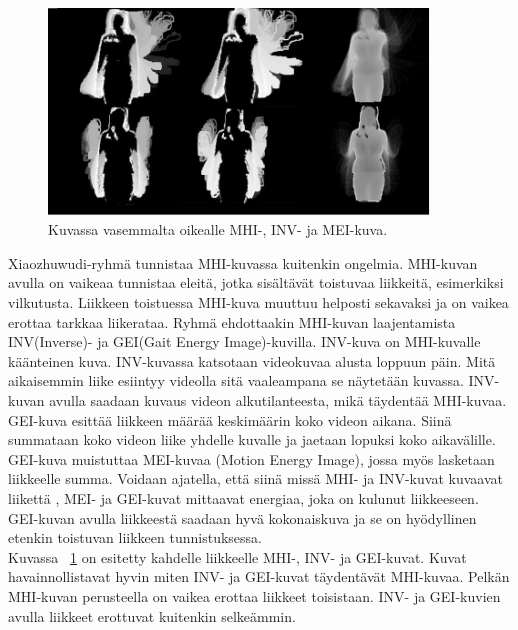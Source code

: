 \begin{figure}[htb]
  \begin{center}
    \includegraphics[width=0.9\textwidth]{mhi_ex.jpg}
    \caption{Kuvassa vasemmalta oikealle MHI-, INV- ja MEI-kuva. \citep {6239179}}
    \label{fig:mhiinvmei}
  \end{center}
\end{figure}

Xiaozhuwudi-ryhmä tunnistaa MHI-kuvassa kuitenkin ongelmia. MHI-kuvan avulla on vaikeaa tunnistaa eleitä, jotka sisältävät toistuvaa liikkeitä, 
esimerkiksi vilkutusta.
Liikkeen toistuessa MHI-kuva muuttuu helposti sekavaksi ja on vaikea erottaa tarkkaa liikerataa. Ryhmä ehdottaakin MHI-kuvan laajentamista 
INV(Inverse)- ja GEI(Gait Energy Image)-kuvilla. INV-kuva on MHI-kuvalle käänteinen kuva. INV-kuvassa katsotaan videokuvaa alusta loppuun päin.
Mitä aikaisemmin liike esiintyy videolla sitä vaaleampana se näytetään kuvassa. INV-kuvan avulla saadaan kuvaus videon alkutilanteesta, mikä täydentää MHI-kuvaa. 
GEI-kuva esittää liikkeen määrää keskimäärin koko videon aikana. Siinä summataan koko videon liike yhdelle kuvalle ja jaetaan lopuksi koko aikavälille.
GEI-kuva muistuttaa MEI-kuvaa (Motion Energy Image), jossa myös lasketaan liikkeelle summa. Voidaan ajatella, että siinä missä MHI- ja INV-kuvat kuvaavat liikettä ,
MEI- ja GEI-kuvat mittaavat energiaa, joka on kulunut liikkeeseen. GEI-kuvan avulla liikkeestä saadaan hyvä kokonaiskuva ja se on hyödyllinen etenkin toistuvan
liikkeen tunnistuksessa. \citep {6239179} \\

Kuvassa ~\ref{fig:mhiinvmei} on esitetty kahdelle
liikkeelle MHI-, INV- ja GEI-kuvat. Kuvat havainnollistavat hyvin miten INV- ja GEI-kuvat
täydentävät MHI-kuvaa. Pelkän MHI-kuvan perusteella on vaikea erottaa liikkeet toisistaan.
INV- ja GEI-kuvien avulla liikkeet erottuvat kuitenkin selkeämmin. \\


